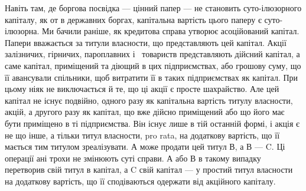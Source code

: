 Навіть там, де боргова посвідка — цінний папер — не становить суто-ілюзорного
капіталу, як от в державних боргах, капітальна вартість цього
паперу є суто-ілюзорна. Ми бачили раніше, як кредитова справа утворює асоційований
капітал. Папери вважається за титули власности, що представляють
цей капітал. Акції залізничих, гірничих, пароплавних і~ товариств представляють
дійсний капітал, а саме капітал, приміщений та діющий в цих
підприємствах, або грошову суму, що її авансували спільники, щоб витратити
її в таких підприємствах як капітал. При цьому ніяк не виключається й те,
що ці акції є просте шахрайство. Але цей капітал не існує подвійно, одного
разу як капітальна вартість титулу власности, акцій, а другого разу як капітал,
що вже дійсно приміщений або що його має бути приміщено в ті підприємства.
Він існує лише в тій останній формі, і акція є не що інше, а
тільки титул власности, pro rata, на додаткову вартість, що її мається тим
титулом зреалізувати. А може продати цей титул В, а В — C. Ці операції ані
трохи не змінюють суті справи. А або В в такому випадку перетворив свій
титул в капітал, а C свій капітал — у простий титул власности на додаткову
вартість, що її сподіваються одержати від акційного капіталу.
